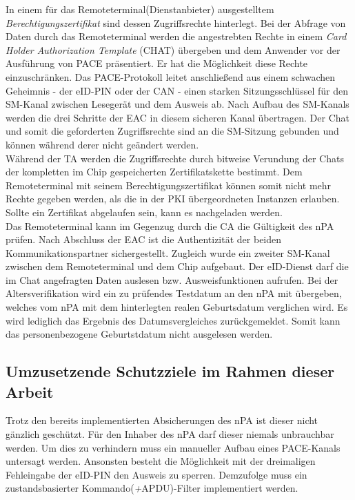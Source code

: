 \documentclass[toc=flat,fontsize=11pt,a4paper,titlepage,headsepline,numbers=noenddot, bibliography=totoc]{scrartcl}
\begin{document}
In einem für das Remoteterminal(Dienstanbieter) ausgestelltem \textit{Berechtigungszertifikat} sind dessen Zugriffsrechte hinterlegt. Bei der Abfrage von Daten durch 
das Remoteterminal werden die angestrebten Rechte in einem \textit{Card Holder Authorization Template} (CHAT) übergeben und dem Anwender vor der Ausführung 
von PACE präsentiert. Er hat die Möglichkeit diese Rechte einzuschränken. Das PACE-Protokoll leitet anschließend aus einem schwachen Geheimnis - der eID-PIN oder 
der CAN - einen starken Sitzungsschlüssel für den SM-Kanal zwischen Lesegerät und dem Ausweis ab. Nach Aufbau des SM-Kanals werden die drei Schritte der EAC in 
diesem sicheren Kanal übertragen. Der Chat und somit die geforderten Zugriffsrechte sind an die SM-Sitzung gebunden und können während derer nicht geändert werden.\\
Während der TA werden die Zugriffsrechte durch bitweise Verundung  der Chats der kompletten im Chip gespeicherten Zertifikatskette bestimmt. Dem Remoteterminal
mit seinem Berechtigungszertifikat können somit nicht mehr Rechte gegeben werden, als die in der PKI übergeordneten Instanzen erlauben. Sollte ein Zertifikat abgelaufen 
sein, kann es nachgeladen werden.\\
Das Remoteterminal kann im Gegenzug durch die CA die Gültigkeit des nPA prüfen.
Nach Abschluss der EAC ist die Authentizität der beiden Kommunikationspartner sichergestellt. Zugleich wurde ein zweiter SM-Kanal zwischen dem Remoteterminal und dem 
Chip aufgebaut. Der eID-Dienst darf die im Chat angefragten Daten auslesen bzw. Ausweisfunktionen aufrufen. 
Bei der Altersverifikation wird ein zu prüfendes Testdatum an den nPA mit übergeben, welches vom nPA mit dem hinterlegten realen Geburtsdatum 
verglichen wird. Es wird lediglich das Ergebnis des Datumsvergleiches zurückgemeldet. Somit kann das personenbezogene Geburtstdatum nicht ausgelesen werden.

\subsection{Umzusetzende Schutzziele im Rahmen dieser Arbeit}
Trotz den bereits implementierten Absicherungen des nPA ist dieser nicht gänzlich geschützt. Für den Inhaber des nPA darf dieser niemals unbrauchbar 
werden. Um dies zu verhindern muss ein manueller Aufbau eines PACE-Kanals untersagt werden. Ansonsten besteht die Möglichkeit mit der dreimaligen 
Fehleingabe der eID-PIN den Ausweis zu sperren.
Demzufolge muss ein zustandsbasierter Kommando(\textit+APDU)-Filter implementiert werden.
\end{document}
